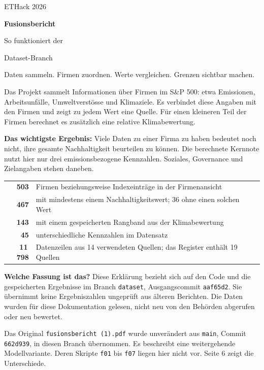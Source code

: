 \documentclass[11pt,a4paper]{article}
\newcommand{\lead}[1]{{\large\sffamily\color{accent}#1}\par}
\begin{document}
\thispagestyle{empty}
{\sffamily\color{accent}\large ETHack 2026\par}
\vspace{8mm}
{\sffamily\bfseries\Huge Fusionsbericht\par}
\vspace{3mm}
{\sffamily\LARGE So funktioniert der\par Dataset-Branch\par}
\vspace{8mm}
\lead{Daten sammeln. Firmen zuordnen. Werte vergleichen. Grenzen sichtbar machen.}
Das Projekt sammelt Informationen über Firmen im S\&P 500: etwa Emissionen, Arbeitsunfälle, Umweltverstösse und Klimaziele. Es verbindet diese Angaben mit den Firmen und zeigt zu jedem Wert eine Quelle. Für einen kleineren Teil der Firmen berechnet es zusätzlich eine relative Klimabewertung.

\textbf{Das wichtigste Ergebnis:} Viele Daten zu einer Firma zu haben bedeutet noch nicht, ihre gesamte Nachhaltigkeit beurteilen zu können. Die berechnete Kernnote nutzt hier nur drei emissionsbezogene Kennzahlen. Soziales, Governance und Zielangaben stehen daneben.

\vspace{3mm}
\begin{tabularx}{\linewidth}{@{}rY@{}}\toprule
\textbf{503} & Firmen beziehungsweise Indexeinträge in der Firmenansicht\\
\textbf{467} & mit mindestens einem Nachhaltigkeitswert; 36 ohne einen solchen Wert\\
\textbf{143} & mit einem gespeicherten Rangband aus der Klimabewertung\\
\textbf{45} & unterschiedliche Kennzahlen im Datensatz\\
\textbf{11\,798} & Datenzeilen aus 14 verwendeten Quellen; das Register enthält 19 Quellen\\\bottomrule
\end{tabularx}

\vspace{3mm}
\textbf{Welche Fassung ist das?} Diese Erklärung bezieht sich auf den Code und die gespeicherten Ergebnisse im Branch \texttt{dataset}, Ausgangscommit \texttt{aaf65d2}. Sie übernimmt keine Ergebniszahlen ungeprüft aus älteren Berichten. Die Daten wurden für diese Dokumentation gelesen, nicht neu von den Behörden abgerufen oder neu bewertet.

Das Original \texttt{fusionsbericht (1).pdf} wurde unverändert aus \texttt{main}, Commit \texttt{662d939}, in diesen Branch übernommen. Es beschreibt eine weitergehende Modellvariante. Deren Skripte \texttt{f01} bis \texttt{f07} liegen hier nicht vor. Seite 6 zeigt die Unterschiede.
\end{document}
